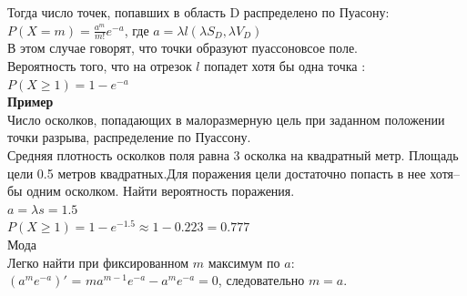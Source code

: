 \documentclass[russian, 12pt, fleqn]{article}
\begin{document}
Тогда число точек, попавших в область D распределено по Пуасону: \\$P(X=m) = \frac{a^m}{m!}e^{-a}$, где $a=\lambda l(\lambda S_D, \lambda V_D)$\\
В этом случае говорят, что точки образуют пуассоновсое поле.\\
Вероятность того, что на отрезок $l$ попадет хотя бы одна точка :\\ $P(X\geq1) = 1 - e^{-a}$\\
\textbf{Пример} \\
Число осколков, попадающих в малоразмерную цель при заданном положении точки разрыва, распределение по Пуассону.\\
Средняя плотность осколков поля равна 3 осколка на квадратный метр. Площадь цели 0.5 метров квадратных.Для поражения цели достаточно попасть в нее хотя--бы одним осколком. Найти вероятность поражения.\\
$a=\lambda s =1.5$\\
$P(X\geq1)=1 - e^{-1.5} \approx 1 - 0.223 = 0.777$\\
Мода\\
Легко найти при фиксированном $m$ максимум по $a$:\\
$(a^me^{-a})'$ = $ma^{m-1}e^{-a} - a^me^{-a} = 0$, следовательно $m = a$.
\end{document}

